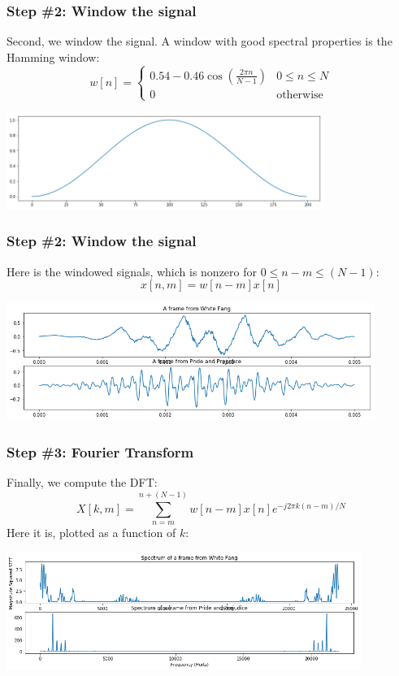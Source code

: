 \documentclass{beamer}
\begin{document}
\begin{frame}
  \frametitle{Step \#2: Window the signal}

  Second, we window the signal.  A window with good spectral
  properties is the Hamming window:
  \[
  w[n] = \begin{cases}
    0.54 - 0.46\cos\left(\frac{2\pi n}{N-1}\right) & 0\le n\le N\\
    0 & \mbox{otherwise}
    \end{cases}
  \]
  \centerline{\includegraphics[height=1.25in]{hamming.png}}
\end{frame}

\begin{frame}
  \frametitle{Step \#2: Window the signal}

  Here is the windowed signals, which is nonzero for $0\le n-m\le (N-1)$:
  \[
  x[n,m] = w[n-m]x[n]
  \]
  \centerline{\includegraphics[height=1.5in]{librivox_windowed.png}}
\end{frame}

\begin{frame}
  \frametitle{Step \#3: Fourier Transform}

  Finally, we compute the DFT:
  \[
  X[k,m] = \sum_{n=m}^{n+(N-1)} w[n-m]x[n]e^{-j2\pi k(n-m)/N} 
  \]
  Here it is, plotted as a function of $k$:
  \centerline{\includegraphics[height=1.5in]{librivox_dftsquared.png}}
\end{frame}
\end{document}
